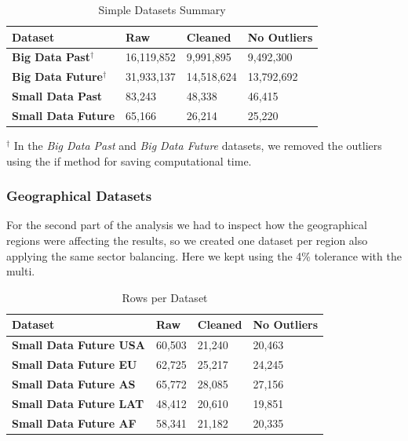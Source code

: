 \documentclass[11pt,english,a4paper,hidelinks]{book}
\begin{document}
\begin{table}[H]
    \centering
    \begin{tabular}{|l|l|l|l|}
        \hline  
        \textbf{Dataset} & \textbf{Raw} & \textbf{Cleaned} & \textbf{No Outliers} \\
        \hline
        \textbf{Big Data Past$^\dagger$} & 16,119,852 & 9,991,895 & 9,492,300 \\
        \hline
        \textbf{Big Data Future$^\dagger$} & 31,933,137 & 14,518,624 & 13,792,692 \\
        \hline 
        \textbf{Small Data Past} & 83,243 & 48,338 & 46,415 \\
        \hline
        \textbf{Small Data Future} & 65,166 & 26,214 & 25,220 \\
        \hline
        \end{tabular}

    \caption{Simple Datasets Summary}
    \label{tab:simple_datasets_summary}
\end{table}

\noindent $^\dagger$ In the \textit{Big Data Past} and \textit{Big Data Future} datasets, we removed the outliers using the \acrshort{if} method for saving computational time.

\subsubsection{Geographical Datasets}
\vspace{0.5cm}
\noindent For the second part of the analysis we had to inspect how the geographical regions were affecting the results, so we created one dataset per region also applying the same sector balancing. Here  we kept using the 4\% tolerance with the \acrshort{multi}.

\begin{table}[H]
    \centering
    \begin{tabular}{|l|l|l|l|}
        \hline  
        \textbf{Dataset} & \textbf{Raw} & \textbf{Cleaned} & \textbf{No Outliers} \\
        \hline
        \textbf{Small Data Future USA} & 60,503 & 21,240 & 20,463 \\
        \hline
        \textbf{Small Data Future EU} & 62,725 & 25,217 & 24,245 \\
        \hline        
        \textbf{Small Data Future AS} & 65,772 & 28,085 & 27,156\\
        \hline
        \textbf{Small Data Future LAT} & 48,412 & 20,610 & 19,851 \\
        \hline
        \textbf{Small Data Future AF} & 58,341 & 21,182 & 20,335 \\
        \hline
        \end{tabular}

    \caption{Rows per Dataset}
    \label{tab:datasets_summary}
\end{table}
\end{document}
